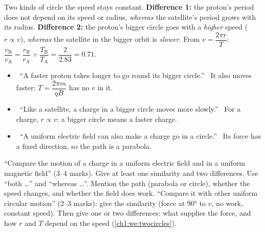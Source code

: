 \begin{workedexample}{Two kinds of circle}
{  the speed stays constant. \textbf{Difference 1:} the proton's period does not
  depend on its speed or radius, \emph{whereas} the satellite's period grows with
  its radius. \textbf{Difference 2:} the proton's bigger circle goes with a
  \emph{higher} speed ($r \propto v$), \emph{whereas} the satellite in the bigger
  orbit is \emph{slower}. From $v = \dfrac{2\pi r}{T}$:
  $\dfrac{v_\mathrm{B}}{v_\mathrm{A}} = \dfrac{r_\mathrm{B}}{r_\mathrm{A}} \div
  \dfrac{T_\mathrm{B}}{T_\mathrm{A}} = \dfrac{2}{2.83} = 0.71$.}
\end{workedexample}

\begin{mistakes}
\begin{itemize}
  \item \xmark\ ``A faster proton takes longer to go round its bigger circle.''
        \cmark\ It also moves faster: $T = \dfrac{2\pi m}{qB}$ has no $v$ in it.
  \item \xmark\ ``Like a satellite, a charge in a bigger circle moves more
        slowly.'' \cmark\ For a charge, $r \propto v$: a bigger circle means a
        faster charge.
  \item \xmark\ ``A uniform electric field can also make a charge go in a
        circle.'' \cmark\ Its force has a fixed direction, so the path is a
        parabola.
\end{itemize}
\end{mistakes}

\begin{examtip}
``Compare the motion of a charge in a uniform electric field and in a uniform
magnetic field'' (3--4 marks). Give at least one similarity and two
differences. Use ``both \ldots'' and ``whereas \ldots''. Mention the path
(parabola or circle), whether the speed changes, and whether the field does
work.
``Compare it with other uniform circular motion'' (2--3 marks): give the
similarity (force at \ang{90} to $v$, no work, constant speed). Then give one or
two differences: what supplies the force, and how $r$ and $T$ depend on the speed
(\cref{ch1:we:twocircles}).
\end{examtip}

